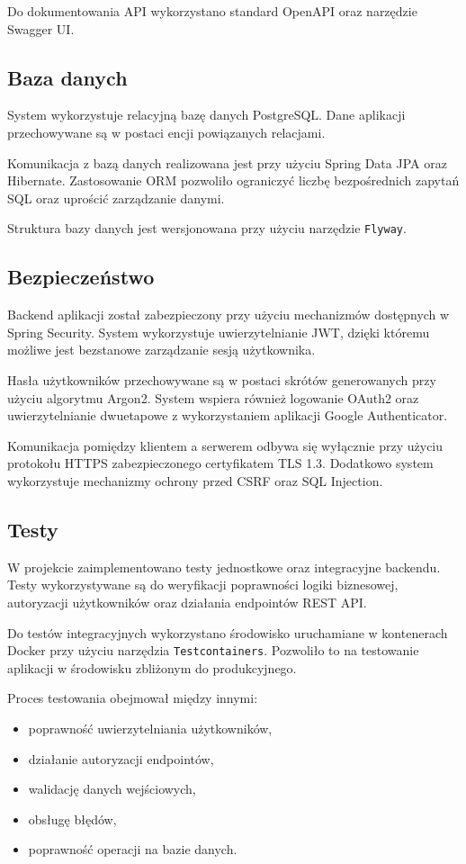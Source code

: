Do dokumentowania API wykorzystano standard OpenAPI oraz narzędzie Swagger UI.

\subsection{Baza danych}

System wykorzystuje relacyjną bazę danych PostgreSQL. Dane aplikacji przechowywane są w postaci encji powiązanych relacjami.

Komunikacja z bazą danych realizowana jest przy użyciu Spring Data JPA oraz Hibernate. Zastosowanie ORM pozwoliło ograniczyć liczbę bezpośrednich zapytań SQL oraz uprościć zarządzanie danymi.

Struktura bazy danych jest wersjonowana przy użyciu narzędzie \verb|Flyway|.

\subsection{Bezpieczeństwo}

Backend aplikacji został zabezpieczony przy użyciu mechanizmów dostępnych w Spring Security. System wykorzystuje uwierzytelnianie JWT, dzięki któremu możliwe jest bezstanowe zarządzanie sesją użytkownika.

Hasła użytkowników przechowywane są w postaci skrótów generowanych przy użyciu algorytmu Argon2. System wspiera również logowanie OAuth2 oraz uwierzytelnianie dwuetapowe z wykorzystaniem aplikacji Google Authenticator.

Komunikacja pomiędzy klientem a serwerem odbywa się wyłącznie przy użyciu protokołu HTTPS zabezpieczonego certyfikatem TLS 1.3. Dodatkowo system wykorzystuje mechanizmy ochrony przed CSRF oraz SQL Injection.

\subsection{Testy}

W projekcie zaimplementowano testy jednostkowe oraz integracyjne backendu. Testy wykorzystywane są do weryfikacji poprawności logiki biznesowej, autoryzacji użytkowników oraz działania endpointów REST API.

Do testów integracyjnych wykorzystano środowisko uruchamiane w kontenerach Docker przy użyciu narzędzia \verb|Testcontainers|. Pozwoliło to na testowanie aplikacji w środowisku zbliżonym do produkcyjnego.

Proces testowania obejmował między innymi:
\begin{itemize}
	\item poprawność uwierzytelniania użytkowników,
	\item działanie autoryzacji endpointów,
	\item walidację danych wejściowych,
	\item obsługę błędów,
	\item poprawność operacji na bazie danych.
\end{itemize}

